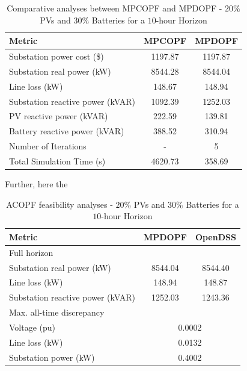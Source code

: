 \documentclass[../../outputs/main.tex]{subfiles}
\begin{document}
\begin{table}[h!]
    \centering
    \caption{Comparative analyses between MPCOPF and MPDOPF - $20 \%$ PVs and $30 \%$ Batteries for a $10$-hour Horizon}
    \begin{tabular}{|l|c|c|}
    \hline
    \textbf{Metric} & \textbf{MPCOPF} & \textbf{MPDOPF} \\ \hline
    Substation power cost (\$) & 1197.87 & 1197.87 \\ \hline
    Substation real power (kW) & 8544.28 & 8544.04 \\ \hline
    Line loss (kW) & 148.67 & 148.94 \\ \hline
    Substation reactive power (kVAR) & 1092.39 & 1252.03 \\ \hline
    PV reactive power (kVAR) & 222.59 & 139.81 \\ \hline
    Battery reactive power (kVAR) & 388.52 &  310.94 \\ \hline
    Number of Iterations & - & 5 \\ \hline
    Total Simulation Time (s) & 4620.73 & 358.69 \\ \hline
    \end{tabular}
    \label{table:opt-10-20-30}
\end{table}



Further, here the 

\begin{table}[h!]
    \centering
    \caption{ACOPF feasibility analyses - $20 \%$ PVs and $30 \%$ Batteries for a $10$-hour Horizon}
    \begin{tabular}{|l|c|c|}
    \hline
    \textbf{Metric} & \textbf{MPDOPF} & \textbf{OpenDSS} \\ \hline
    Full horizon  & \multicolumn{2}{c|}{} \\ \hline
    \quad Substation real power (kW) & 8544.04 & 8544.40 \\ \hline
    \quad Line loss (kW) & 148.94 & 148.87 \\ \hline
    \quad Substation reactive power (kVAR) & 1252.03 & 1243.36 \\ \hline
    Max. all-time discrepancy & \multicolumn{2}{c|}{} \\ \hline
    \quad Voltage (pu) & \multicolumn{2}{c|}{0.0002} \\ \hline
    \quad Line loss (kW) & \multicolumn{2}{c|}{0.0132} \\ \hline
    \quad Substation power (kW) & \multicolumn{2}{c|}{0.4002} \\ \hline
    \end{tabular}
    \label{table:feas-copf-10-20-30}
\end{table}
\end{document}
